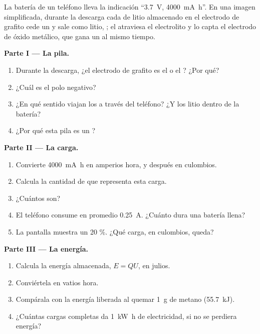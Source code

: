 \begin{problem}
\label{pb:g12:cells-and-electrolysis:1}
La batería de un teléfono lleva la indicación ``\qty{3.7}{V},
\qty{4000}{mA.h}''. En una imagen simplificada, durante la descarga cada
 de litio almacenado en el electrodo de grafito cede un  y
sale como  litio, ; el  atraviesa el electrolito
y lo capta el electrodo de óxido metálico, que gana un  al mismo
tiempo.

\medskip
\noindent\textbf{Parte I --- La pila.}
\begin{enumerate}
  \item Durante la descarga, ¿el electrodo de grafito es el  o el
        ? ¿Por qué?
  \item ¿Cuál es el polo negativo?
  \item ¿En qué sentido viajan los  a través del teléfono? ¿Y
        los  litio dentro de la batería?
  \item ¿Por qué esta pila es un ?
\end{enumerate}

\medskip
\noindent\textbf{Parte II --- La carga.}
\begin{enumerate}[resume]
  \item Convierte \qty{4000}{mA.h} en amperios hora, y después en
        culombios.
  \item Calcula la cantidad de  que representa esta carga.
  \item ¿Cuántos  son?
  \item El teléfono consume en promedio \qty{0.25}{A}. ¿Cuánto dura una
        batería llena?
  \item La pantalla muestra un 20 \%. ¿Qué carga, en culombios, queda?
\end{enumerate}

\medskip
\noindent\textbf{Parte III --- La energía.}
\begin{enumerate}[resume]
  \item Calcula la energía almacenada, $E = Q U$, en julios.
  \item Conviértela en vatios hora.
  \item Compárala con la energía liberada al quemar \qty{1}{g} de metano
        (\qty{55.7}{kJ}).
  \item ¿Cuántas cargas completas da \qty{1}{kW.h} de electricidad, si no
        se perdiera energía?
\end{enumerate}


\end{problem}
